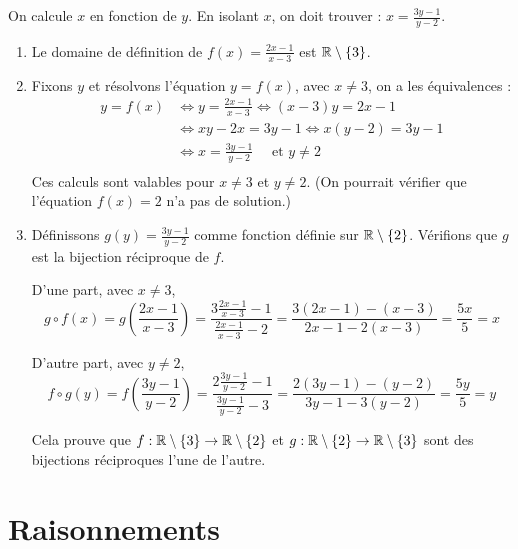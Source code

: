 \documentclass[11pt,class=report,crop=false]{standalone}
\begin{document}
\indication
On calcule $x$ en fonction de $y$. En isolant $x$, on doit trouver : $x= \frac{3y-1}{y-2}$.
\finindication

\correction
\sauteligne
\begin{enumerate}
    \item Le domaine de définition de $f(x) = \frac{2x-1}{x-3}$ est $\mathbb{R} \setminus \{ 3 \}$.
    
    \item Fixons $y$ et résolvons l'équation $y = f(x)$, avec $x\neq3$, on a les équivalences :   
    \begin{align*}
        y = f(x)  
        & \iff y = \frac{2x-1}{x-3} \iff (x-3)y = 2x-1 \\
        & \iff xy -2x = 3y-1 \iff x(y-2) = 3y-1 \\
        & \iff x =  \frac{3y-1}{y-2} \quad \text{ et } y \neq 2 \\
     \end{align*} 
    Ces calculs sont valables pour $x \neq 3$ et $y \neq 2$.
    (On pourrait vérifier que l'équation $f(x) = 2$ n'a pas de solution.)
    
    
    \item 
    Définissons $g(y) =  \frac{3y-1}{y-2}$ comme fonction définie sur $\mathbb{R} \setminus \{ 2 \}$.
    Vérifions que $g$ est la bijection réciproque de $f$.
    
    D'une part, avec $x \neq 3$,  
    $$g \circ f(x) 
    = g \left( \frac{2x-1}{x-3} \right) 
    = \frac{3\frac{2x-1}{x-3}-1}{\frac{2x-1}{x-3}-2}
    = \frac{3(2x-1) - (x-3)}{2x-1 - 2(x-3)}
    = \frac{5x}{5}
    = x
    $$
    
    D'autre part, avec $y \neq 2$,
    $$f \circ g(y) 
    = f \left( \frac{3y-1}{y-2} \right) 
    = \frac{2\frac{3y-1}{y-2}-1}{\frac{3y-1}{y-2}-3} 
    = \frac{2(3y-1)-(y-2)}{3y-1 -3(y-2)}     
    = \frac{5y}{5}
    = y
    $$    
    
    Cela prouve que $f : \mathbb{R} \setminus \{ 3 \} \to \mathbb{R} \setminus \{ 2 \}$ et
    $g : \mathbb{R} \setminus \{ 2 \} \to \mathbb{R} \setminus \{ 3 \}$
    sont des bijections réciproques l'une de l'autre.
\end{enumerate} 
\fincorrection
\finexercice



\section{Raisonnements}
\end{document}
